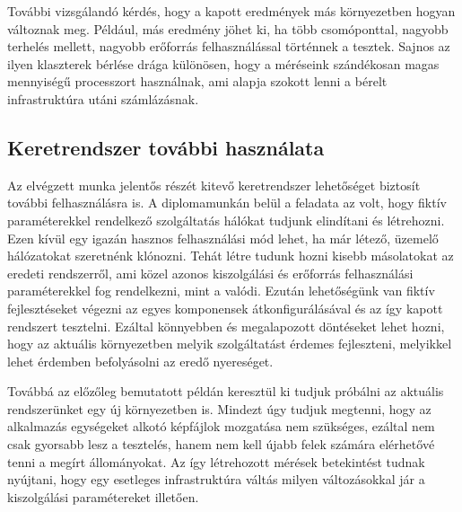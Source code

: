 További vizsgálandó kérdés, hogy a kapott eredmények más környezetben hogyan változnak meg.
Például, más eredmény jöhet ki, ha több csomóponttal, nagyobb terhelés mellett, nagyobb erőforrás felhasználással történnek a tesztek.
Sajnos az ilyen klaszterek bérlése drága különösen, hogy a méréseink szándékosan magas mennyiségű processzort használnak, ami alapja szokott lenni a bérelt infrastruktúra utáni számlázásnak.


\subsection{Keretrendszer további használata}
Az elvégzett munka jelentős részét kitevő keretrendszer lehetőséget biztosít további felhasználásra is.
A diplomamunkán belül a feladata az volt, hogy fiktív paraméterekkel rendelkező szolgáltatás hálókat tudjunk elindítani és létrehozni.
Ezen kívül egy igazán hasznos felhasználási mód lehet, ha már létező, üzemelő hálózatokat szeretnénk klónozni.
Tehát létre tudunk hozni kisebb másolatokat az eredeti rendszerről, ami közel azonos kiszolgálási és erőforrás felhasználási paraméterekkel fog rendelkezni, mint a valódi.
Ezután lehetőségünk van fiktív fejlesztéseket végezni az egyes komponensek átkonfigurálásával és az így kapott rendszert tesztelni.
Ezáltal könnyebben és megalapozott döntéseket lehet hozni, hogy az aktuális környezetben melyik szolgáltatást érdemes fejleszteni, melyikkel lehet érdemben befolyásolni az eredő nyereséget.

Továbbá az előzőleg bemutatott példán keresztül ki tudjuk próbálni az aktuális rendszerünket egy új környezetben is.
Mindezt úgy tudjuk megtenni, hogy az alkalmazás egységeket alkotó képfájlok mozgatása nem szükséges, ezáltal nem csak gyorsabb lesz a tesztelés, hanem nem kell újabb felek számára elérhetővé tenni a megírt állományokat.
Az így létrehozott mérések betekintést tudnak nyújtani, hogy egy esetleges infrastruktúra váltás milyen változásokkal jár a kiszolgálási paramétereket illetően.